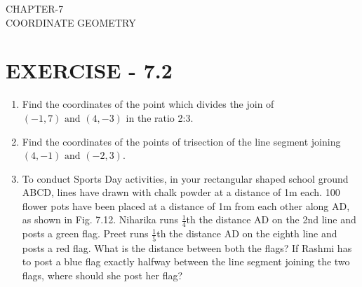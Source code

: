 \documentclass[12pt]{article}
\begin{document}
\begin{center}
\textbf\large{CHAPTER-7 \\ COORDINATE GEOMETRY}
\end{center}

\section*{EXERCISE - 7.2}
\begin{enumerate}

\item Find the coordinates of the point which divides the join of $(-1,7) \text{ and } (4,-3)$ in the ratio 2:3.
\item Find the coordinates of the points of trisection of the line segment joining $(4,-1) \text{ and } (-2,3)$.

\item To conduct Sports Day activities, in your rectangular shaped school                   
ground ABCD, lines have 
drawn with chalk powder at a                 
distance of 1m each. 100 flower pots have been placed at a distance of 1m 
from each other along AD, as shown 
in Fig. 7.12. Niharika runs $ \displaystyle \frac 14 $th the 
distance AD on the 2nd line and 
posts a green flag. Preet runs $ \displaystyle \frac 15 $th 
the distance AD on the eighth line 
and posts a red flag. What is the 
distance between both the flags? If 
Rashmi has to post a blue flag exactly 
halfway between the line segment 
joining the two flags, where should 
she post her flag?
                     

\end{enumerate}
\end{document}
